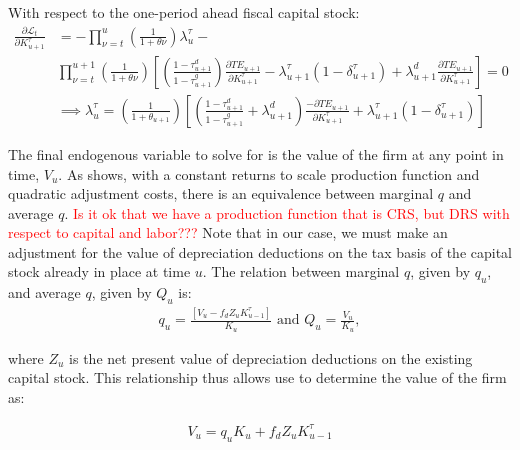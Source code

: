 With respect to the one-period ahead fiscal capital stock:
 \begin{equation}
\label{eqn:foc_ktau}
\begin{split}
 \frac{\partial \mathcal{L}_{t}}{\partial K^{\tau}_{u+1}}  &=  - \prod_{\nu=t}^{u}\left(\frac{1}{1+\theta{\nu}}\right)\lambda^{\tau}_{u} -  \\
 & \prod_{\nu=t}^{u+1}\left(\frac{1}{1+\theta{\nu}}\right)\left[\left(\frac{1-\tau^{d}_{u+1}}{1-\tau^{g}_{u+1}}\right)\frac{\partial TE_{u+1}}{\partial K^{\tau}_{u+1}} - \lambda^{\tau}_{u+1}(1-\delta^{\tau}_{u+1}) + \lambda^{d}_{u+1}\frac{\partial TE_{u+1}}{\partial K^{\tau}_{u+1}} \right] = 0 \\
& \implies \lambda^{\tau}_{u} = \left(\frac{1}{1+\theta_{u+1}}\right)\left[\left(\frac{1-\tau^{d}_{u+1}}{1-\tau^{g}_{u+1}} + \lambda^{d}_{u+1} \right)\frac{- \partial TE_{u+1}}{\partial K^{\tau}_{u+1}} + \lambda^{\tau}_{u+1}(1-\delta^{\tau}_{u+1})\right] 
 \end{split}
\end{equation}



The final endogenous variable to solve for is the value of the firm at any point in time, $V_{u}$.  As \citet{Hayashi1982} shows, with a constant returns to scale production function and quadratic adjustment costs, there is an equivalence between marginal $q$ and average $q$.  \textcolor{red}{Is it ok that we have a production function that is CRS, but DRS with respect to capital and labor???}  Note that in our case, we must make an adjustment for the value of depreciation deductions on the tax basis of the capital stock already in place at time $u$.  The relation between marginal $q$, given by $q_{u}$, and average $q$, given by $Q_{u}$ is:
 \begin{equation}
\label{eqn:avg_q}
\begin{split}
q_{u}=\frac{[V_{u}-f_{d}Z_{u}K^{\tau}_{u-1}]}{K_{u}} \text{ and } Q_{u}=\frac{V_{u}}{K_{u}},
\end{split}
\end{equation}

\noindent\noindent where $Z_{u}$ is the net present value of depreciation deductions on the existing capital stock.  This relationship thus allows use to determine the value of the firm as:

 \begin{equation}
\label{eqn:solve_firmvalue}
\begin{split}
 V_{u}=q_{u}K_{u}+f_{d}Z_{u}K^{\tau}_{u-1}
\end{split}
\end{equation}


